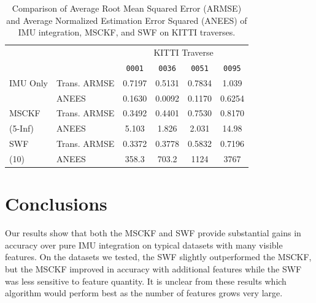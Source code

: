 \documentclass[letterpaper, 10 pt, conference]{ieeeconf}  %
\newcommand\T{\rule{0pt}{2.6ex}}        %
\newcommand\B{\rule[-1.2ex]{0pt}{0pt}} %
\begin{document}
\begin{table}
    \centering
    \caption{Comparison of Average Root Mean Squared Error (ARMSE) and Average Normalized Estimation Error Squared (ANEES) of IMU integration, MSCKF, and SWF on KITTI traverses.}
    \begin{tabular}{llcccc} 
                    &                   & \multicolumn{4}{c}{KITTI Traverse} \B      \\ \cline{3-6}
                    &                   & \texttt{0001} & \texttt{0036} & \texttt{0051} & \texttt{0095}    \T\B    \\ \hline
        IMU Only    & Trans. ARMSE      & 0.7197    & 0.5131    & 0.7834    & 1.039     \T      \\
                    & ANEES             & 0.1630    & 0.0092    & 0.1170    & 0.6254         \B      \\ \hline
        MSCKF       & Trans. ARMSE      & 0.3492    & 0.4401    & 0.7530    & 0.8170  \T      \\
        (5-Inf)     & ANEES             & 5.103     & 1.826     & 2.031     & 14.98          \B      \\ \hline
        SWF         & Trans. ARMSE      & 0.3372    & 0.3778    & 0.5832    & 0.7196  \T      \\
        (10)        & ANEES             & 358.3     & 703.2     & 1124      & 3767    \B      \\ \hline
    \end{tabular}
    \label{tab:kitti_results}
    \vspace{-0.2cm}
\end{table}


\section{Conclusions} \label{sec:conclusions}
Our results show that both the MSCKF and SWF provide substantial gains in accuracy over pure IMU integration on typical datasets with many visible features.
On the datasets we tested, the SWF slightly outperformed the MSCKF, but the MSCKF improved in accuracy with additional features while the SWF was less sensitive to feature quantity.
It is unclear from these results which algorithm would perform best as the number of features grows very large.
\end{document}
